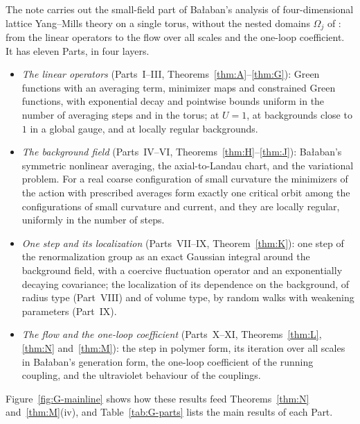 The note carries out the small-field part of Ba\l aban's analysis of four-dimensional lattice Yang--Mills theory on a single torus, without the nested domains $\Omega_j$ of \cite{BalVar}: from the linear operators to the flow over all scales and the one-loop coefficient. It has eleven Parts, in four layers.
\begin{itemize}
\item \emph{The linear operators} (Parts~I--III, Theorems~\ref{thm:A}--\ref{thm:G}): Green functions with an averaging term, minimizer maps and constrained Green functions, with exponential decay and pointwise bounds uniform in the number of averaging steps and in the torus; at $U=1$, at backgrounds close to $1$ in a global gauge, and at locally regular backgrounds.
\item \emph{The background field} (Parts~IV--VI, Theorems~\ref{thm:H}--\ref{thm:J}): Ba\l aban's symmetric nonlinear averaging, the axial-to-Landau chart, and the variational problem. For a real coarse configuration of small curvature the minimizers of the action with prescribed averages form exactly one critical orbit among the configurations of small curvature and current, and they are locally regular, uniformly in the number of steps.
\item \emph{One step and its localization} (Parts~VII--IX, Theorem~\ref{thm:K}): one step of the renormalization group as an exact Gaussian integral around the background field, with a coercive fluctuation operator and an exponentially decaying covariance; the localization of its dependence on the background, of radius type (Part~VIII) and of volume type, by random walks with weakening parameters (Part~IX).
\item \emph{The flow and the one-loop coefficient} (Parts~X--XI, Theorems~\ref{thm:L}, \ref{thm:N} and~\ref{thm:M}): the step in polymer form, its iteration over all scales in Ba\l aban's generation form, the one-loop coefficient of the running coupling, and the ultraviolet behaviour of the couplings.
\end{itemize}
Figure~\ref{fig:G-mainline} shows how these results feed Theorems~\ref{thm:N} and~\ref{thm:M}(iv), and Table~\ref{tab:G-parts} lists the main results of each Part.

